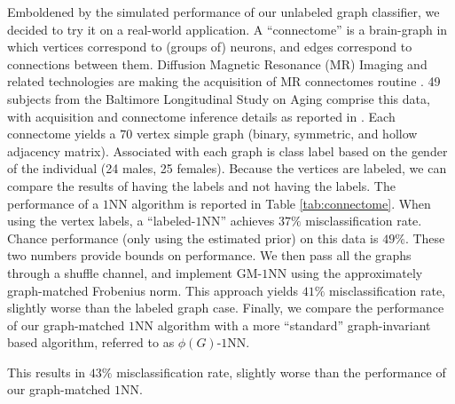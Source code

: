 \documentclass[10pt,journal,cspaper,compsoc]{IEEEtran}
\begin{document}
Emboldened by the simulated performance of our unlabeled graph classifier, we decided to try it on a real-world application.  
A ``connectome'' is a brain-graph in which vertices correspond to (groups of) neurons, and edges correspond to connections between them.  Diffusion Magnetic Resonance (MR) Imaging and related technologies are making the acquisition of MR connectomes routine \cite{Hagmann2010}.  49 subjects from the Baltimore Longitudinal Study on Aging comprise this data, with acquisition and connectome inference details as reported in \cite{Gray11}.  Each connectome yields a $70$ vertex simple graph (binary, symmetric, and hollow adjacency matrix).  Associated with each graph is class label based on the gender of the individual (24 males, 25 females).  Because the vertices are labeled, we can compare the results of having the labels and not having the labels.  The performance of a $1$NN algorithm is reported in Table \ref{tab:connectome}. When using the vertex labels, a ``labeled-$1$NN'' achieves $37\%$ misclassification rate.  Chance performance (only using the estimated prior) on this data is $49\%$.  These two numbers provide bounds on performance.  We then pass all the graphs through a shuffle channel, and implement GM-$1$NN using the approximately graph-matched Frobenius norm.  This approach yields $41\%$ misclassification rate, slightly worse than the labeled graph case.  Finally, we compare the performance of our graph-matched $1$NN algorithm with a more ``standard'' graph-invariant based algorithm, referred to as $\phi(G)$-$1$NN.  

 This results in $43\%$ misclassification rate, slightly worse than the performance of our graph-matched $1$NN.  



\end{document}

